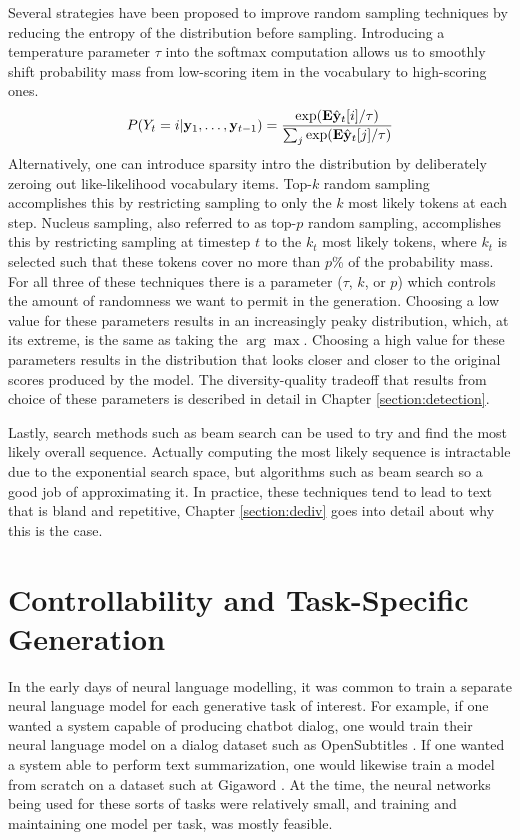 Several strategies have been proposed to improve random sampling techniques by reducing the entropy of the distribution before sampling.
Introducing a temperature parameter $\tau$ into the softmax computation allows us to smoothly shift probability mass from low-scoring item in the vocabulary to high-scoring ones.
\begin{align}
    \label{equation:softmax_with_temp}
    P(Y_t=i | \mathbf{y}_1, \ldots, \mathbf{y}_{t-1}) = \frac{\exp(\mathbf{E}\hat{\mathbf{y}}_t[i]/\tau)}{\sum_j\exp(\mathbf{E}\hat{\mathbf{y}}_t[j]/\tau)}
\end{align}
Alternatively, one can introduce sparsity intro the distribution by deliberately zeroing out like-likelihood vocabulary items.
Top-$k$ random sampling accomplishes this by restricting sampling to only the $k$ most likely tokens at each step.
Nucleus sampling, also referred to as top-$p$ random sampling, accomplishes this by restricting sampling at timestep $t$ to the $k_t$ most likely tokens, where $k_t$ is selected such that these tokens cover no more than $p$\% of the probability mass.
For all three of these techniques there is a parameter ($\tau$, $k$, or $p$) which controls the amount of randomness we want to permit in the generation.
Choosing a low value for these parameters results in an increasingly peaky distribution, which, at its extreme, is the same as taking the $\arg \max$. 
Choosing a high value for these parameters results in the distribution that looks closer and closer to the original scores produced by the model.
The diversity-quality tradeoff that results from choice of these parameters is described in detail in Chapter \ref{section:detection}.

Lastly, search methods such as beam search can be used to try and find the most likely overall sequence.
Actually computing the most likely sequence is intractable due to the exponential search space, but algorithms such as beam search so a good job of approximating it.
In practice, these techniques tend to lead to text that is bland and repetitive,
Chapter \ref{section:dediv} goes into detail about why this is the case.

\section{Controllability and Task-Specific Generation}

In the early days of neural language modelling, it was common to train a separate neural language model for each generative task of interest.
For example, if one wanted a system capable of producing chatbot dialog, one would train their neural language model on a dialog dataset such as OpenSubtitles \citep{vinyals2015neural}.
If one wanted a system able to perform text summarization, one would likewise train a model from scratch on a dataset such at Gigaword \cite{nallapati2016abstractive}.
At the time, the neural networks being used for these sorts of tasks were relatively small, and training and maintaining one model per task, was mostly feasible.

